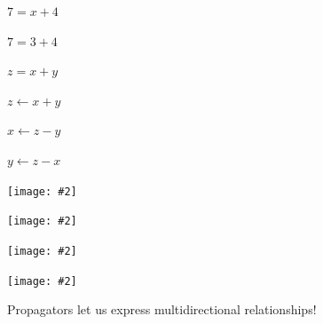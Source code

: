\documentclass[usenames,dvipsnames,svgnames,table,aspectratio=1610,mathserif]{beamer}
\newcommand{\nl}{\vspace{\baselineskip}}
\newcommand{\imageslide}[2][1]{{
\begin{frame}\begin{center}
\texttt{[image: \#2]}
\end{center}\end{frame}
}}
\begin{document}
\begin{frame}
  \begin{center}
    \begin{LARGE}
      $7 = x + 4$
    \end{LARGE}
  \end{center}
\end{frame}


\begin{frame}
  \begin{center}
    \begin{LARGE}
      $7 = 3 + 4$
    \end{LARGE}
  \end{center}
\end{frame}


\begin{frame}
  \begin{center}
    \begin{LARGE}
      $z = x + y$
    \end{LARGE}
  \end{center}
\end{frame}


\begin{frame}
  \begin{center}
    \begin{LARGE}
      $z \leftarrow x + y$

      \nl

      $x \leftarrow z - y$

      \nl

      $y \leftarrow z - x$

    \end{LARGE}
  \end{center}
\end{frame}


\imageslide{diagrams/badd1.pdf}
\imageslide{diagrams/badd2.pdf}
\imageslide{diagrams/badd3.pdf}
\imageslide{diagrams/badd4.pdf}


\begin{frame}
\begin{center}
{\LARGE Propagators let us express multidirectional relationships!}
\end{center}
\end{frame}
\end{document}
